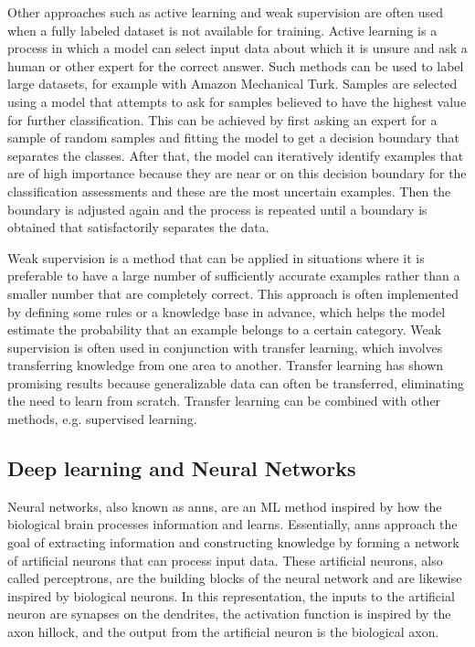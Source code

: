         Other approaches such as active learning and weak supervision are often used when a fully labeled dataset is not available for training. Active learning is a process in which a model can select input data about which it is unsure and ask a human or other expert for the correct answer. Such methods can be used to label large datasets, for example with Amazon Mechanical Turk. Samples are selected using a model that attempts to ask for samples believed to have the highest value for further classification. This can be achieved by first asking an expert for a sample of random samples and fitting the model to get a decision boundary that separates the classes. After that, the model can iteratively identify examples that are of high importance because they are near or on this decision boundary for the classification assessments and these are the most uncertain examples. Then the boundary is adjusted again and the process is repeated until a boundary is obtained that satisfactorily separates the data.
        
        Weak supervision is a method that can be applied in situations where it is preferable to have a large number of sufficiently accurate examples rather than a smaller number that are completely correct. This approach is often implemented by defining some rules or a knowledge base in advance, which helps the model estimate the probability that an example belongs to a certain category. Weak supervision is often used in conjunction with transfer learning, which involves transferring knowledge from one area to another. Transfer learning has shown promising results because generalizable data can often be transferred, eliminating the need to learn from scratch. Transfer learning can be combined with other methods, e.g. supervised learning.
    
    \subsection{Deep learning and Neural Networks} \label{sec:2_background_theory_deep_learning_and_neural_networks}
    Neural networks, also known as \glspl{ann}, are an ML method inspired by how the biological brain processes information and learns. Essentially, \glspl{ann} approach the goal of extracting information and constructing knowledge by forming a network of artificial neurons that can process input data. These artificial neurons, also called perceptrons, are the building blocks of the neural network and are likewise inspired by biological neurons. In this representation, the inputs to the artificial neuron are synapses on the dendrites, the activation function is inspired by the axon hillock, and the output from the artificial neuron is the biological axon.
    
